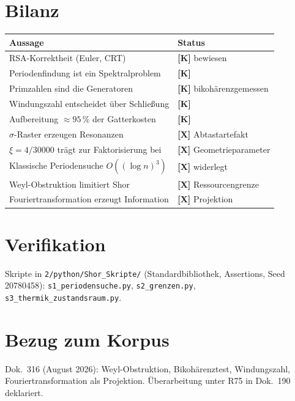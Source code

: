 \section{Bilanz}

\begin{center}
\begin{tabular}{ll}
\toprule
Aussage & Status \\
\midrule
RSA-Korrektheit (Euler, CRT) & \textbf{[K]} bewiesen \\
Periodenfindung ist ein Spektralproblem & \textbf{[K]} \\
Primzahlen sind die Generatoren & \textbf{[K]} bikohärenzgemessen \\
Windungszahl entscheidet über Schließung & \textbf{[K]} \\
Aufbereitung $\approx 95\,\%$ der Gatterkosten & \textbf{[K]} \\
$\sigma$-Raster erzeugen Resonanzen & \textbf{[X]} Abtastartefakt \\
$\xi=4/30000$ trägt zur Faktorisierung bei & \textbf{[X]} Geometrieparameter \\
Klassische Periodensuche $O((\log n)^3)$ & \textbf{[X]} widerlegt \\
Weyl-Obstruktion limitiert Shor & \textbf{[X]} Ressourcengrenze \\
Fouriertransformation erzeugt Information & \textbf{[X]} Projektion \\
\bottomrule
\end{tabular}
\end{center}

\section{Verifikation}

Skripte in \texttt{2/python/Shor\_Skripte/} (Standardbibliothek,
Assertions, Seed 20780458): \texttt{s1\_periodensuche.py},
\texttt{s2\_grenzen.py}, \texttt{s3\_thermik\_zustandsraum.py}.

\section{Bezug zum Korpus}

Dok.~316 (August 2026): Weyl-Obstruktion, Bikohärenztest,
Windungszahl, Fouriertransformation als Projektion. Überarbeitung
unter R75 in Dok.~190 deklariert.
